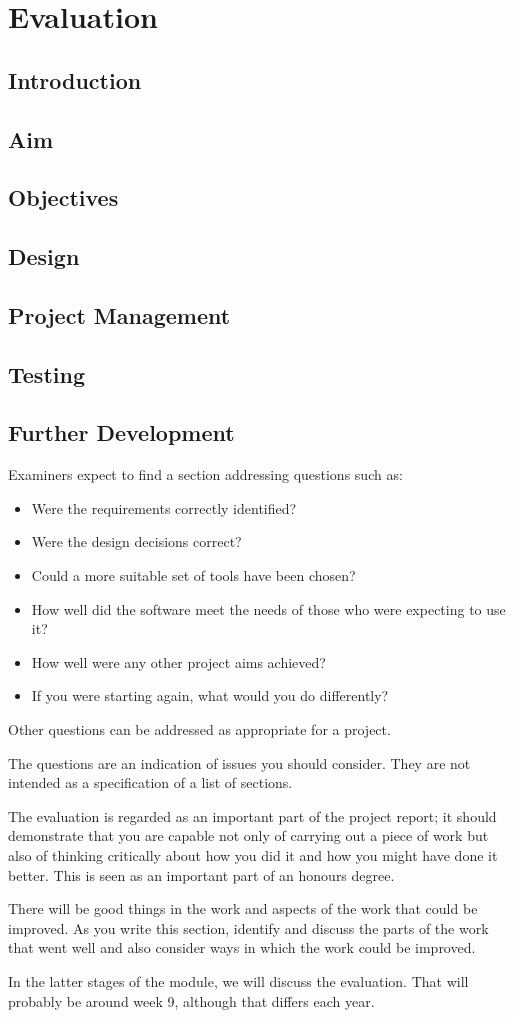 \chapter{Evaluation}
\section{Introduction}
\section{Aim}
\section{Objectives}
\section{Design}
\section{Project Management}
\section{Testing}

\section{Further Development}
Examiners expect to find a section addressing questions such as:

\begin{itemize}
   \item Were the requirements correctly identified? 
   \item Were the design decisions correct?
   \item Could a more suitable set of tools have been chosen?
   \item How well did the software meet the needs of those who were expecting to use it?
   \item How well were any other project aims achieved?
   \item If you were starting again, what would you do differently?
\end{itemize}

Other questions can be addressed as appropriate for a project. 

The questions are an indication of issues you should consider. They are not intended as a specification of a list of sections.

The evaluation is regarded as an important part of the project report; it should demonstrate that you are capable not only of carrying out a piece of work but also of thinking critically about how you did it and how you might have done it better. This is seen as an important part of an honours degree. 

There will be good things in the work and aspects of the work that could be improved. As you write this section, identify and discuss the parts of the work that went well and also consider ways in which the work could be improved. 

In the latter stages of the module, we will discuss the evaluation. That will probably be around week 9, although that differs each year. 